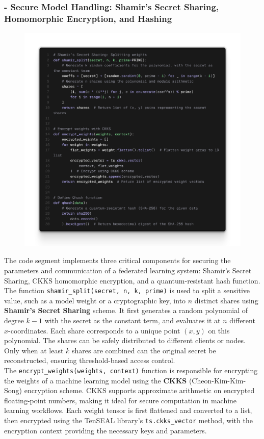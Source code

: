 \documentclass[10pt]{article}
\begin{document}
\subsubsection*{- Secure Model Handling: Shamir's Secret Sharing, Homomorphic Encryption, and Hashing}
\begin{figure}[H]
	\centering
	\includegraphics[height = 0.47\textheight]{img/QFL_code/1.png}
\end{figure}
The code segment implements three critical components for securing the parameters and communication of a federated learning system: Shamir’s Secret Sharing, CKKS homomorphic encryption, and a quantum-resistant hash function.\\
The function \texttt{shamir\_split(secret, n, k, prime)} is used to split a sensitive value, such as a model weight or a cryptographic key, into $n$ distinct shares using \textbf{Shamir’s Secret Sharing} scheme. It first generates a random polynomial of degree $k-1$ with the secret as the constant term, and evaluates it at $n$ different $x$-coordinates. Each share corresponds to a unique point $(x, y)$ on this polynomial. The shares can be safely distributed to different clients or nodes. Only when at least $k$ shares are combined can the original secret be reconstructed, ensuring threshold-based access control.\\
The \texttt{encrypt\_weights(weights, context)} function is responsible for encrypting the weights of a machine learning model using the \textbf{CKKS} (Cheon-Kim-Kim-Song) encryption scheme. CKKS supports approximate arithmetic on encrypted floating-point numbers, making it ideal for secure computation in machine learning workflows. Each weight tensor is first flattened and converted to a list, then encrypted using the TenSEAL library’s \texttt{ts.ckks\_vector} method, with the encryption context providing the necessary keys and parameters.\\
\end{document}
